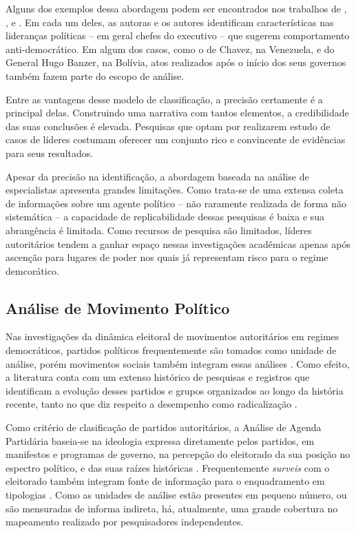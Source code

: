 \documentclass[
12pt,				%
openright,			%
twoside,			%
a4paper,			%
english,			%
french,				%
spanish,			%
brazil				%
]{abntex2}
\begin{document}
Alguns dos exemplos dessa abordagem podem ser encontrados nos trabalhos de , ,  e . Em cada um deles, as autoras e os autores identificam características nas lideranças políticas -- em geral chefes do executivo -- que sugerem comportamento anti-democrático. Em algum dos casos, como o de Chavez, na Venezuela, e do General Hugo Banzer, na Bolívia, atos realizados após o início dos seus governos também fazem parte do escopo de análise.

Entre as vantagens desse modelo de classificação, a precisão certamente é a principal delas. Construindo uma narrativa com tantos elementos, a credibilidade das suas conclusões é elevada. Pesquisas que optam por realizarem estudo de casos de líderes costumam oferecer um conjunto rico e convincente de evidências para seus resultados.

Apesar da precisão na identificação, a abordagem baseada na análise de especialistas apresenta grandes limitações. Como trata-se de uma extensa coleta de informações sobre um agente político -- não raramente realizada de forma não sistemática -- a capacidade de replicabilidade dessas pesquisas é baixa e sua abrangência é limitada. Como recursos de pesquisa são limitados, líderes autoritários tendem a ganhar espaço nessas investigações acadêmicas apenas após ascenção para lugares de poder nos quais já representam risco para o regime demcorático.

\subsection{Análise de Movimento Político}

Nas investigações da dinâmica eleitoral de movimentos autoritários em regimes democráticos, partidos políticos frequentemente são tomados como unidade de análise, porém movimentos sociais também integram essas análises \cite{caiani2017radical}. Como efeito, a literatura conta com um extenso histórico de pesquisas e registros que identificam a evolução desses partidos e grupos organizados ao longo da história recente, tanto no que diz respeito a desempenho como radicalização \cite{norris2005radical, mudde2009populist, caiani2017radical, mudde2016introduction, mudde2017ideational}. 

Como critério de clasificação de partidos autoritários, a Análise de Agenda Partidária baseia-se na ideologia expressa diretamente pelos partidos, em manifestos e programas de governo, na percepção do eleitorado da sua posição no espectro político, e das suas raízes históricas \cite{mudde2000ideology}. Frequentemente \emph{surveis} com o eleitorado também integram fonte de informação para o enquadramento em tipologias \cite{booth1984political, booth1994paths, macwilliams2016decides}. Como as unidades de análise estão presentes em pequeno número, ou são mensuradas de informa indireta, há, atualmente, uma grande cobertura no mapeamento realizado por pesquisadores independentes.
\end{document}

